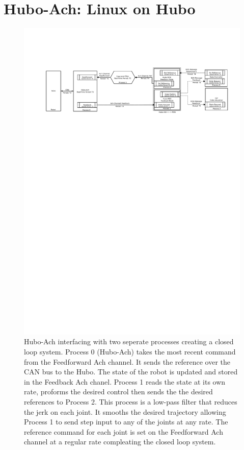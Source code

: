 \section{Hubo-Ach: Linux on Hubo}

\begin{figure}[thpb]
  \centering
\includegraphics[width=2.0\columnwidth]{./pix/hubo-ach-diagram-ros.pdf}
  \caption{Hubo-Ach interfacing with two seperate processes creating a closed loop system.  Process 0 (Hubo-Ach) takes the most recent command from the Feedforward Ach channel.
  It sends the reference over the CAN bus to the Hubo.  
  The state of the robot is updated and stored in the Feedback Ach chanel.  
  Process 1 reads the state at its own rate, proforms the desired control then sends the the desired references to Process 2.  
This process is a low-pass filter that reduces the jerk on each joint.  
It smooths the desired trajectory allowing Process 1 to send step input to any of the joints at any rate. 
The reference command for each joint is set on the Feedforward Ach channel at a regular rate compleating the closed loop system.}
  \label{fig:graph-ros}
\end{figure}


